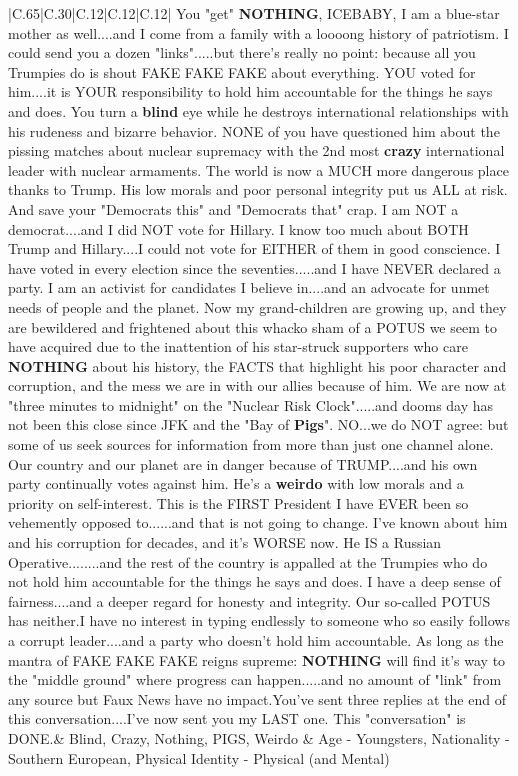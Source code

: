 \documentclass[11pt]{article}
\newlength\mylength
\begin{document}
\begin{center}
\begin{longtable}{|C{.65\mylength}|C{.30\mylength}|C{.12\mylength}|C{.12\mylength}|C{.12\mylength}|}
  \small You "get" \textbf{NOTHING}, ICEBABY,  I am a blue-star mother as well....and I come from a family with a loooong history of patriotism.  I could send you a dozen "links".....but there's really no point:  because all you Trumpies do is shout FAKE FAKE FAKE about everything.  YOU voted for him....it is YOUR responsibility to hold him accountable for the things he says and does.  You turn a \textbf{blind} eye while he destroys international relationships with his rudeness and bizarre behavior.   NONE of you have questioned him about the pissing matches about nuclear supremacy with the 2nd most \textbf{crazy} international leader with nuclear armaments.  The world is now a MUCH more dangerous place thanks to Trump.  His low morals and poor personal integrity put us ALL at risk.  And save your "Democrats this" and "Democrats that" crap.  I am NOT a democrat....and I did NOT vote for Hillary.  I know too much about BOTH Trump and Hillary....I could not vote for EITHER of them in good conscience.  I have voted in every election since the seventies.....and I have NEVER declared a party.  I am an activist for candidates I believe in....and an advocate for unmet needs of people and the planet.  Now my grand-children are growing up, and they are bewildered and frightened about this whacko sham of a POTUS we seem to have acquired due to the inattention of his star-struck supporters who care \textbf{NOTHING} about his history, the FACTS that highlight his poor character and corruption, and the mess we are in with our allies because of him.  We are now at "three minutes to midnight" on the "Nuclear Risk Clock".....and dooms day has not been this close since JFK and the "Bay of \textbf{Pigs}".   NO...we do NOT agree:  but some of us seek sources for information from more than just one channel alone.  Our country and our planet are in danger because of TRUMP....and his own party continually votes against him.  He's a \textbf{weirdo} with low morals and a priority on self-interest. This is the FIRST President I have EVER been so vehemently opposed to......and that is not going to change.  I've known about him and his corruption for decades, and it's WORSE now.   He IS a Russian Operative........and the rest of the country is appalled at the Trumpies who do not hold him accountable for the things he says and does.  I have a deep sense of fairness....and a deeper regard for honesty and integrity.   Our so-called POTUS has neither.I have no interest in typing endlessly to someone who so easily follows a corrupt leader....and a party who doesn't hold him accountable.  As long as the mantra of FAKE FAKE FAKE reigns supreme: \textbf{NOTHING} will find it's way to the "middle ground" where progress can happen.....and no amount of "link" from any source but Faux News have no impact.You've sent three replies at the end of this conversation....I've now sent you my LAST one.  This "conversation" is DONE.\normalsize   & Blind, Crazy, Nothing, PIGS, Weirdo & Age - Youngsters, Nationality - Southern European, Physical Identity - Physical (and Mental) 
\end{longtable}
\end{center}
\end{document}
